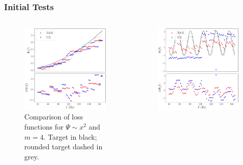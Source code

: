 \documentclass{beamer}
\begin{document}
\begin{frame}
\frametitle{Initial Tests}
\begin{columns}
\begin{column}{0.5\textwidth}
\begin{figure}[h]
\centering
\includegraphics[width=\textwidth]{im/phase_loss_comp_quadratic_m4}
\caption{Comparison of loss functions for $\Psi \sim x^2$ and $m=4$. Target in black; rounded target dashed in grey.}
\end{figure}
\end{column}
\begin{column}{0.5\textwidth}
\begin{figure}[h]
\centering
\includegraphics[width=\textwidth]{im/phase_loss_comp_sin_m3}

\end{figure}
\end{column}
\end{columns}
\end{frame}
\end{document}
